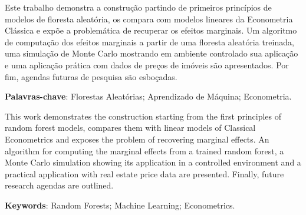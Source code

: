 %
%

\begin{resumo}

Este trabalho demonstra a construção partindo de primeiros princípios de modelos de floresta aleatória, os compara com modelos lineares da Econometria Clássica e expõe a problemática de recuperar os efeitos marginais. Um algoritmo de computação dos efeitos marginais a partir de uma floresta aleatória treinada, uma simulação de Monte Carlo mostrando em ambiente controlado sua aplicação e uma aplicação prática com dados de preços de imóveis são apresentados. Por fim, agendas futuras de pesquisa são esboçadas.


\textbf{Palavras-chave}: Florestas Aleatórias; Aprendizado de Máquina; Econometria. %
\end{resumo}


\begin{resumo}[ABSTRACT] %

This work demonstrates the construction starting from the first principles of random forest models, compares them with linear models of Classical Econometrics and exposes the problem of recovering marginal effects. An algorithm for computing the marginal effects from a trained random forest, a Monte Carlo simulation showing its application in a controlled environment and a practical application with real estate price data are presented. Finally, future research agendas are outlined.

\textbf{Keywords}: Random Forests; Machine Learning; Econometrics. 	
\end{resumo}



